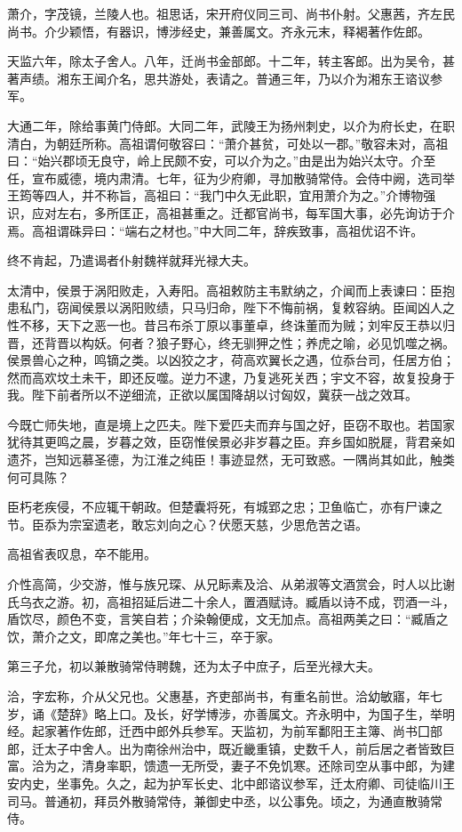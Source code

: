 \documentclass[12pt,UTF8]{ctexbook}
\begin{document}
萧介，字茂镜，兰陵人也。祖思话，宋开府仪同三司、尚书仆射。父惠茜，齐左民尚书。介少颖悟，有器识，博涉经史，兼善属文。齐永元末，释褐著作佐郎。

天监六年，除太子舍人。八年，迁尚书金部郎。十二年，转主客郎。出为吴令，甚著声绩。湘东王闻介名，思共游处，表请之。普通三年，乃以介为湘东王谘议参军。

大通二年，除给事黄门侍郎。大同二年，武陵王为扬州刺史，以介为府长史，在职清白，为朝廷所称。高祖谓何敬容曰：“萧介甚贫，可处以一郡。”敬容未对，高祖曰：“始兴郡顷无良守，岭上民颇不安，可以介为之。”由是出为始兴太守。介至任，宣布威德，境内肃清。七年，征为少府卿，寻加散骑常侍。会侍中阙，选司举王筠等四人，并不称旨，高祖曰：“我门中久无此职，宜用萧介为之。”介博物强识，应对左右，多所匡正，高祖甚重之。迁都官尚书，每军国大事，必先询访于介焉。高祖谓硃异曰：“端右之材也。”中大同二年，辞疾致事，高祖优诏不许。

终不肯起，乃遣谒者仆射魏祥就拜光禄大夫。

太清中，侯景于涡阳败走，入寿阳。高祖敕防主韦默纳之，介闻而上表谏曰：臣抱患私门，窃闻侯景以涡阳败绩，只马归命，陛下不悔前祸，复敕容纳。臣闻凶人之性不移，天下之恶一也。昔吕布杀丁原以事董卓，终诛董而为贼；刘牢反王恭以归晋，还背晋以构妖。何者？狼子野心，终无驯狎之性；养虎之喻，必见饥噬之祸。侯景兽心之种，鸣镝之类。以凶狡之才，荷高欢翼长之遇，位忝台司，任居方伯；然而高欢坟土未干，即还反噬。逆力不逮，乃复逃死关西；宇文不容，故复投身于我。陛下前者所以不逆细流，正欲以属国降胡以讨匈奴，冀获一战之效耳。

今既亡师失地，直是境上之匹夫。陛下爱匹夫而弃与国之好，臣窃不取也。若国家犹待其更鸣之晨，岁暮之效，臣窃惟侯景必非岁暮之臣。弃乡国如脱屣，背君亲如遗芥，岂知远慕圣德，为江淮之纯臣！事迹显然，无可致惑。一隅尚其如此，触类何可具陈？

臣朽老疾侵，不应辄干朝政。但楚囊将死，有城郢之忠；卫鱼临亡，亦有尸谏之节。臣忝为宗室遗老，敢忘刘向之心？伏愿天慈，少思危苦之语。

高祖省表叹息，卒不能用。

介性高简，少交游，惟与族兄琛、从兄眎素及洽、从弟淑等文酒赏会，时人以比谢氏乌衣之游。初，高祖招延后进二十余人，置酒赋诗。臧盾以诗不成，罚酒一斗，盾饮尽，颜色不变，言笑自若；介染翰便成，文无加点。高祖两美之曰：“臧盾之饮，萧介之文，即席之美也。”年七十三，卒于家。

第三子允，初以兼散骑常侍聘魏，还为太子中庶子，后至光禄大夫。

洽，字宏称，介从父兄也。父惠基，齐吏部尚书，有重名前世。洽幼敏寤，年七岁，诵《楚辞》略上口。及长，好学博涉，亦善属文。齐永明中，为国子生，举明经。起家著作佐郎，迁西中郎外兵参军。天监初，为前军鄱阳王主簿、尚书囗部郎，迁太子中舍人。出为南徐州治中，既近畿重镇，史数千人，前后居之者皆致巨富。洽为之，清身率职，馈遗一无所受，妻子不免饥寒。还除司空从事中郎，为建安内史，坐事免。久之，起为护军长史、北中郎谘议参军，迁太府卿、司徒临川王司马。普通初，拜员外散骑常侍，兼御史中丞，以公事免。顷之，为通直散骑常侍。
\end{document}
